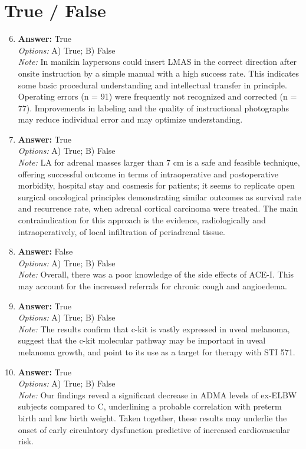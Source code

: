 \documentclass[12pt]{article}
\begin{document}
\section*{True / False}
\begin{enumerate}[label=\arabic*.]
\setcounter{enumi}{5}
\item \textbf{Answer:} True
\\ \textit{Options:} A) True; B) False
\\ \textit{Note:} In manikin laypersons could insert LMAS in the correct direction after onsite instruction by a simple manual with a high success rate. This indicates some basic procedural understanding and intellectual transfer in principle. Operating errors (n = 91) were frequently not recognized and corrected (n = 77). Improvements in labeling and the quality of instructional photographs may reduce individual error and may optimize understanding.
\item \textbf{Answer:} True
\\ \textit{Options:} A) True; B) False
\\ \textit{Note:} LA for adrenal masses larger than 7 cm is a safe and feasible technique, offering successful outcome in terms of intraoperative and postoperative morbidity, hospital stay and cosmesis for patients; it seems to replicate open surgical oncological principles demonstrating similar outcomes as survival rate and recurrence rate, when adrenal cortical carcinoma were treated. The main contraindication for this approach is the evidence, radiologically and intraoperatively, of local infiltration of periadrenal tissue.
\item \textbf{Answer:} False
\\ \textit{Options:} A) True; B) False
\\ \textit{Note:} Overall, there was a poor knowledge of the side effects of ACE-I. This may account for the increased referrals for chronic cough and angioedema.
\item \textbf{Answer:} True
\\ \textit{Options:} A) True; B) False
\\ \textit{Note:} The results confirm that c-kit is vastly expressed in uveal melanoma, suggest that the c-kit molecular pathway may be important in uveal melanoma growth, and point to its use as a target for therapy with STI 571.
\item \textbf{Answer:} True
\\ \textit{Options:} A) True; B) False
\\ \textit{Note:} Our findings reveal a significant decrease in ADMA levels of ex-ELBW subjects compared to C, underlining a probable correlation with preterm birth and low birth weight. Taken together, these results may underlie the onset of early circulatory dysfunction predictive of increased cardiovascular risk.
\end{enumerate}
\end{document}
